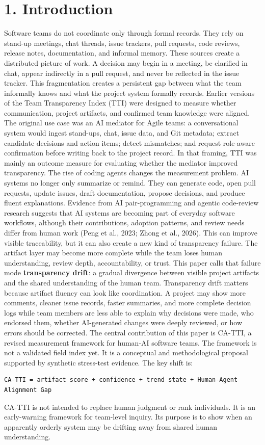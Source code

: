 \documentclass[11pt]{article}
\begin{document}
\section{1. Introduction}
Software teams do not coordinate only through formal records. They rely on stand-up meetings, chat threads, issue trackers, pull requests, code reviews, release notes, documentation, and informal memory. These sources create a distributed picture of work. A decision may begin in a meeting, be clarified in chat, appear indirectly in a pull request, and never be reflected in the issue tracker. This fragmentation creates a persistent gap between what the team informally knows and what the project system formally records.
Earlier versions of the Team Transparency Index (TTI) were designed to measure whether communication, project artifacts, and confirmed team knowledge were aligned. The original use case was an AI mediator for Agile teams: a conversational system would ingest stand-ups, chat, issue data, and Git metadata; extract candidate decisions and action items; detect mismatches; and request role-aware confirmation before writing back to the project record. In that framing, TTI was mainly an outcome measure for evaluating whether the mediator improved transparency.
The rise of coding agents changes the measurement problem. AI systems no longer only summarize or remind. They can generate code, open pull requests, update issues, draft documentation, propose decisions, and produce fluent explanations. Evidence from AI pair-programming and agentic code-review research suggests that AI systems are becoming part of everyday software workflows, although their contributions, adoption patterns, and review needs differ from human work (Peng et al., 2023; Zhong et al., 2026). This can improve visible traceability, but it can also create a new kind of transparency failure. The artifact layer may become more complete while the team loses human understanding, review depth, accountability, or trust.
This paper calls that failure mode \textbf{transparency drift}: a gradual divergence between visible project artifacts and the shared understanding of the human team. Transparency drift matters because artifact fluency can look like coordination. A project may show more comments, cleaner issue records, faster summaries, and more complete decision logs while team members are less able to explain why decisions were made, who endorsed them, whether AI-generated changes were deeply reviewed, or how errors should be corrected.
The central contribution of this paper is CA-TTI, a revised measurement framework for human-AI software teams. The framework is not a validated field index yet. It is a conceptual and methodological proposal supported by synthetic stress-test evidence. The key shift is:
\begin{Verbatim}[fontsize=\small]
CA-TTI = artifact score + confidence + trend state + Human-Agent Alignment Gap
\end{Verbatim}
CA-TTI is not intended to replace human judgment or rank individuals. It is an early-warning framework for team-level inquiry. Its purpose is to show when an apparently orderly system may be drifting away from shared human understanding.
\end{document}
